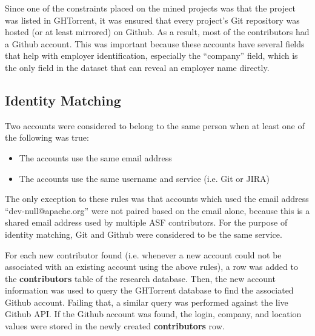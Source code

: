 Since one of the constraints placed on the mined projects was that the project was listed in GHTorrent, it was ensured that every project's Git repository was hosted (or at least mirrored) on Github. As a result, most of the contributors had a Github account. This was important because these accounts have several fields that help with employer identification, especially the ``company'' field, which is the only field in the dataset that can reveal an employer name directly.
\subsection{Identity Matching}\label{mergingsec}
Two accounts were considered to belong to the same person when at least one of the following was true:
\begin{itemize}
	\item The accounts use the same email address
	\item The accounts use the same username and service (i.e. Git or JIRA)
\end{itemize}
The only exception to these rules was that accounts which used the email address ``dev-null@apache.org'' were not paired based on the email alone, because this is a shared email address used by multiple ASF contributors. For the purpose of identity matching, Git and Github were considered to be the same service.

For each new contributor found (i.e. whenever a new account could not be associated with an existing account using the above rules), a row was added to the \textbf{contributors} table of the research database. Then, the new account information was used to query the GHTorrent database to find the associated Github account. Failing that, a similar query was performed against the live Github API. If the Github account was found, the login, company, and location values were stored in the newly created \textbf{contributors} row.


